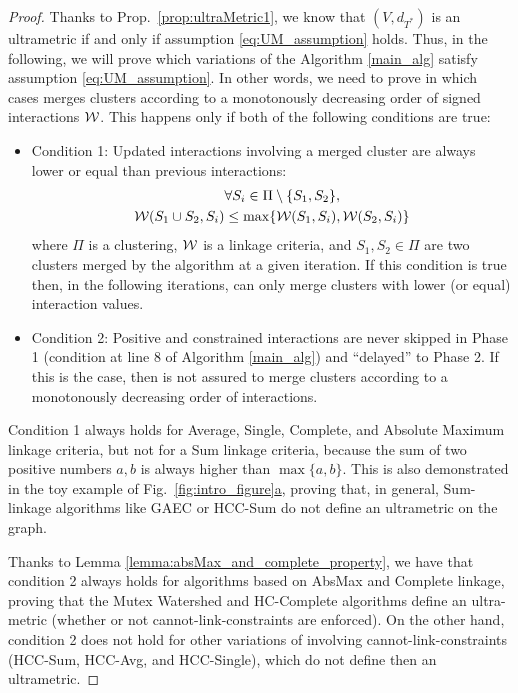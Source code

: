 \secondUltraMetricProperty*
\begin{proof}
Thanks to Prop.~\ref{prop:ultraMetric1}, we know that $(V, d_{T^*})$ is an ultrametric if and only if assumption \ref{eq:UM_assumption} holds. Thus, in the following, we will prove which variations of the \algname{} Algorithm \ref{main_alg} satisfy assumption \ref{eq:UM_assumption}. 
In other words, we need to prove in which cases \algname{} merges clusters according to a monotonously decreasing order of signed interactions $\mathcal{W}{}$. This happens only if both of the following conditions are true:
\begin{itemize}
\item Condition 1: Updated interactions involving a merged cluster are always lower or equal than previous interactions:
\begin{align}\label{eq:condition1}
& \forall S_i \in \Pi \setminus \{S_1, S_2\}, \nonumber \\
\mathcal{W}{}(S_1 \cup S_2, S_i) &\leq \max \{ \mathcal{W}{}(S_1, S_i), \mathcal{W}{}(S_2, S_i)\} 
\end{align}
where $\Pi$ is a clustering, $\mathcal{W}{}$ is a linkage criteria, and $S_1,S_2\in \Pi$ are two clusters merged by the algorithm at a given iteration. If this condition is true then, in the following iterations, \algname{} can only merge clusters with lower (or equal) interaction values. 
\item Condition 2: Positive and constrained interactions are never skipped in Phase 1 (condition at line 8 of Algorithm \ref{main_alg}) and ``delayed'' to Phase 2. If this is the case, then \algname{} is not assured to merge clusters according to a monotonously decreasing order of interactions. 
\end{itemize}
Condition 1 always holds for Average, Single, Complete, and Absolute Maximum linkage criteria, but not for a Sum linkage criteria, because the sum of two positive numbers $a,b$ is always higher than $\max\{a,b\}$. This is also demonstrated in the toy example of Fig.~\hyperref[fig:intro_figure]{\ref*{fig:intro_figure}a}, proving that, in general, Sum-linkage algorithms like GAEC or HCC-Sum do not define an ultrametric on the graph.

Thanks to Lemma \ref{lemma:absMax_and_complete_property}, we have that condition 2 always holds for algorithms based on AbsMax and Complete linkage, proving that the Mutex Watershed and HC-Complete algorithms define an ultra-metric (whether or not cannot-link-constraints are enforced). On the other hand, condition 2 does not hold for other variations of \algname{} involving cannot-link-constraints (HCC-Sum, HCC-Avg, and HCC-Single), which do not define then an ultrametric. 


\end{proof}
